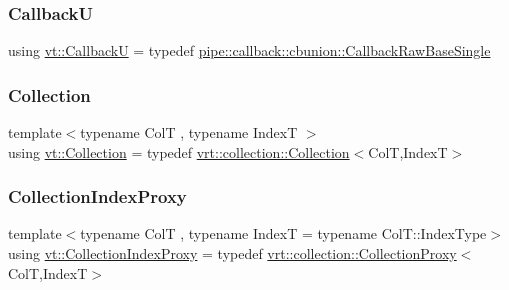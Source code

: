 \mbox{\label{namespacevt_af79a43a97bc3593fc349f086c874c48e}} 
\subsubsection{\texorpdfstring{CallbackU}{CallbackU}}
{\footnotesize\ttfamily using \hyperlink{namespacevt_af79a43a97bc3593fc349f086c874c48e}{vt\+::\+CallbackU} = typedef \hyperlink{structvt_1_1pipe_1_1callback_1_1cbunion_1_1_callback_raw_base_single}{pipe\+::callback\+::cbunion\+::\+Callback\+Raw\+Base\+Single}}

\mbox{\label{namespacevt_ac72e048964e4bb536faaa8bc90f58db7}} 
\subsubsection{\texorpdfstring{Collection}{Collection}}
{\footnotesize\ttfamily template$<$typename ColT , typename IndexT $>$ \\
using \hyperlink{namespacevt_ac72e048964e4bb536faaa8bc90f58db7}{vt\+::\+Collection} = typedef \hyperlink{structvt_1_1vrt_1_1collection_1_1_collection}{vrt\+::collection\+::\+Collection}$<$ColT,IndexT$>$}

\mbox{\label{namespacevt_a2be17f5dafb626fe9f58d762b6aad2f0}} 
\subsubsection{\texorpdfstring{Collection\+Index\+Proxy}{CollectionIndexProxy}}
{\footnotesize\ttfamily template$<$typename ColT , typename IndexT  = typename Col\+T\+::\+Index\+Type$>$ \\
using \hyperlink{namespacevt_a2be17f5dafb626fe9f58d762b6aad2f0}{vt\+::\+Collection\+Index\+Proxy} = typedef \hyperlink{structvt_1_1vrt_1_1collection_1_1_collection_proxy}{vrt\+::collection\+::\+Collection\+Proxy}$<$ColT,IndexT$>$}

\mbox{\label{namespacevt_a290f7e8941f9f411b54cdb15b6cea107}} 
